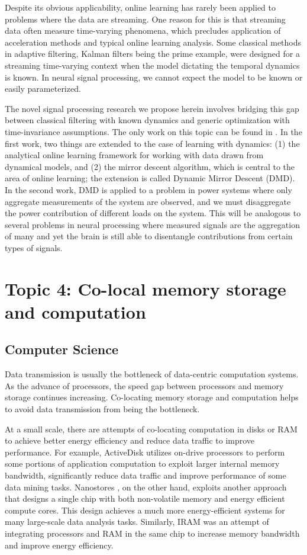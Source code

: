 \documentclass[12pt]{report}
\begin{document}
Despite its obvious applicability, online learning has rarely been applied to problems where the data are streaming. One reason for this is that streaming data often measure time-varying phenomena, which precludes application of acceleration methods and typical online learning analysis. Some classical methods in adaptive filtering, Kalman filters being the prime example, were designed for a streaming time-varying context when the model dictating the temporal dynamics is known. In neural signal processing, we cannot expect the model to be known or easily parameterized.

The novel signal processing research we propose herein involves bridging this gap between classical filtering with known dynamics and generic optimization with time-invariance assumptions. The only work on this topic can be found in \cite{hall_online_2013, ledva2015inferring}. In the first work, two things are extended to the case of learning with dynamics: (1) the analytical online learning framework for working with data drawn from dynamical models, and (2) the mirror descent algorithm, which is central to the area of online learning; the extension is called Dynamic Mirror Descent (DMD). In the second work, DMD is applied to a problem in power systems where only aggregate measurements of the system are observed, and we must disaggregate the power contribution of different loads on the system. This will be analogous to several problems in neural processing where measured signals are the aggregation of many and yet the brain is still able to disentangle contributions from certain types of signals.

\section*{Topic 4: Co-local memory storage and computation}

\subsection{Computer Science}
Data transmission is usually the bottleneck of data-centric computation systems.
As the advance of processors, the speed gap between processors and memory
storage continues increasing. Co-locating memory storage and computation helps
to avoid data transmission from being the bottleneck.

At a small scale, there are attempts of co-locating computation in disks or RAM
to achieve better energy efficiency and reduce data traffic to improve
performance. For example, ActiveDisk \cite{riedel01, cho13} utilizes on-drive
processors to
perform some portions of application computation to exploit larger internal
memory bandwidth, significantly reduce data traffic and improve performance of
some data mining tasks. Nanostores \cite{nanostores}, on the other hand, exploits another
approach that designs a single chip with both non-volatile memory and energy
efficient compute cores. This design achieves a much more energy-efficient
systems for many large-scale data analysis tasks. Similarly, IRAM \cite{iram} was an
attempt of integrating processors and RAM in the same chip to increase memory
bandwidth and improve energy efficiency.
\end{document}
